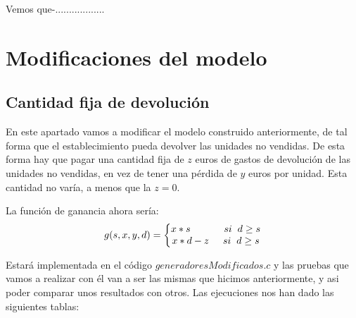\documentclass[11pt,a4paper]{report}
\begin{document}
Vemos que-..................






\section{Modificaciones del modelo}

\subsection{Cantidad fija de devolución}

En este apartado vamos a modificar el modelo construido anteriormente, de tal forma que el establecimiento pueda devolver las unidades
no vendidas. De esta forma hay que pagar una cantidad fija de $z$ euros de gastos de devolución de las unidades no vendidas, en vez de
tener una pérdida de $y$ euros por unidad. Esta cantidad no varía, a menos que la $z=0$.

La función de ganancia ahora sería:
\begin{equation}
	g(s,x,y,d)=\left\{\begin{matrix}
	x*s\hspace{12mm}si\hspace{2mm}d\geq s\\ 
	x*d-z\hspace{5mm}si\hspace{2mm}d\geq s
	\end{matrix}\right.
\end{equation}

Estará implementada en el código $generadoresModificados.c$ y las pruebas que vamos a realizar con él van a ser las mismas que hicimos
anteriormente, y asi poder comparar unos resultados con otros. Las ejecuciones nos han dado las siguientes tablas:
\end{document}
